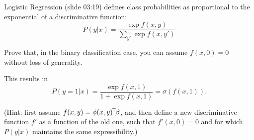 







Logistic Regression (slide 03:19) defines class probabilities as proportional to
the exponential of a discriminative function:
$$P(y|x) = \frac{\exp f(x, y)}{\sum_{y'}\exp f(x, y')}$$

Prove that, in the binary classification case, you can assume $f(x, 0) = 0$
without loss of generality.  

This results in $$P(y=1|x) = \frac{\exp f(x, 1)}{1 + \exp f(x, 1)} =
\sigma(f(x, 1)).$$

(Hint: first assume $f(x, y) = \phi(x, y)^{\!\top\!}\beta$, and then define a new
discriminative function $f'$ as a function of the old one, such that $f'(x,
0)=0$ and for which $P(y|x)$ maintains the same expressibility.)

